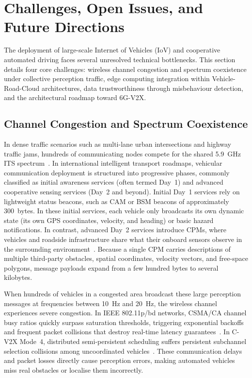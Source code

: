 \section{Challenges, Open Issues, and Future Directions}
\label{sec:challenges_future}

The deployment of large-scale Internet of Vehicles (IoV) and cooperative automated driving faces several unresolved technical bottlenecks.
This section details four core challenges: wireless channel congestion and spectrum coexistence under collective perception traffic, edge computing integration within Vehicle-Road-Cloud architectures, data trustworthiness through misbehaviour detection, and the architectural roadmap toward 6G-V2X.

\subsection{Channel Congestion and Spectrum Coexistence}
\label{subsec:congestion_coexistence}

In dense traffic scenarios such as multi-lane urban intersections and highway traffic jams, hundreds of communicating nodes compete for the shared 5.9~GHz ITS spectrum~\cite{zhang2026cooperative}.
In international intelligent transport roadmaps, vehicular communication deployment is structured into progressive phases, commonly classified as initial awareness services (often termed Day~1) and advanced cooperative sensing services (Day~2 and beyond).
Initial Day~1 services rely on lightweight status beacons, such as CAM or BSM beacons of approximately 300~bytes.
In these initial services, each vehicle only broadcasts its own dynamic state (its own GPS coordinates, velocity, and heading) or basic hazard notifications.
In contrast, advanced Day~2 services introduce CPMs, where vehicles and roadside infrastructure share what their onboard sensors observe in the surrounding environment~\cite{zhang2026cooperative}.
Because a single CPM carries descriptions of multiple third-party obstacles, spatial coordinates, velocity vectors, and free-space polygons, message payloads expand from a few hundred bytes to several kilobytes.

When hundreds of vehicles in a congested area broadcast these large perception messages at frequencies between 10~Hz and 20~Hz, the wireless channel experiences severe congestion.
In IEEE 802.11p/bd networks, CSMA/CA channel busy ratios quickly surpass saturation thresholds, triggering exponential backoffs and frequent packet collisions that destroy real-time latency guarantees~\cite{ansari2021joint}.
In C-V2X Mode~4, distributed semi-persistent scheduling suffers persistent subchannel selection collisions among uncoordinated vehicles~\cite{molina2020comparison}.
These communication delays and packet losses directly cause perception errors, making automated vehicles miss real obstacles or localise them incorrectly.

